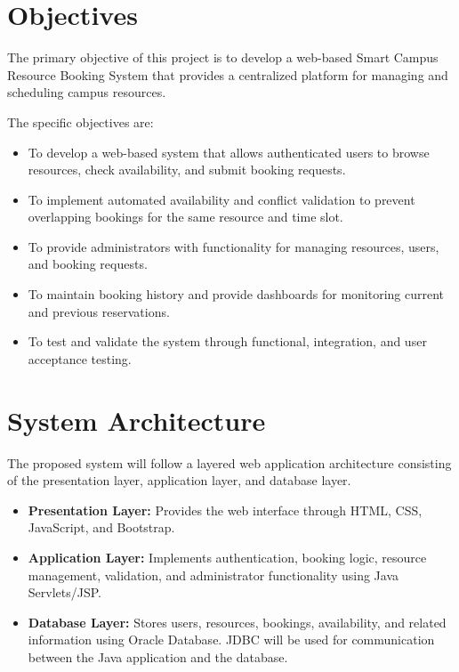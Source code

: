 \documentclass[12pt,a4paper]{article}
\begin{document}
\section{Objectives}

The primary objective of this project is to develop a web-based
Smart Campus Resource Booking System that provides a centralized
platform for managing and scheduling campus resources.

The specific objectives are:

\begin{itemize}
    \item To develop a web-based system that allows authenticated
    users to browse resources, check availability, and submit
    booking requests.

    \item To implement automated availability and conflict
    validation to prevent overlapping bookings for the same
    resource and time slot.

    \item To provide administrators with functionality for managing
    resources, users, and booking requests.

    \item To maintain booking history and provide dashboards for
    monitoring current and previous reservations.

    \item To test and validate the system through functional,
    integration, and user acceptance testing.
\end{itemize}

\section{System Architecture}

The proposed system will follow a layered web application
architecture consisting of the presentation layer, application
layer, and database layer.

\begin{itemize}
    \item \textbf{Presentation Layer:} Provides the web interface
    through HTML, CSS, JavaScript, and Bootstrap.

    \item \textbf{Application Layer:} Implements authentication,
    booking logic, resource management, validation, and
    administrator functionality using Java Servlets/JSP.

    \item \textbf{Database Layer:} Stores users, resources,
    bookings, availability, and related information using Oracle
    Database. JDBC will be used for communication between the
    Java application and the database.
\end{itemize}
\end{document}
